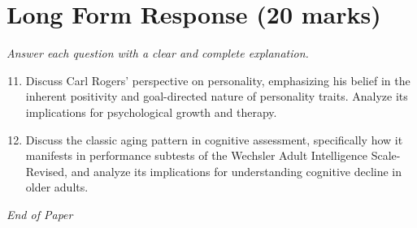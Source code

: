 \documentclass[12pt]{article}
\begin{document}
\section*{Long Form Response (20 marks)}
\textit{Answer each question with a clear and complete explanation.}
\begin{enumerate}[label=\arabic*.]
\setcounter{enumi}{10}
\item Discuss Carl Rogers' perspective on personality, emphasizing his belief in the inherent positivity and goal-directed nature of personality traits. Analyze its implications for psychological growth and therapy.
\item Discuss the classic aging pattern in cognitive assessment, specifically how it manifests in performance subtests of the Wechsler Adult Intelligence Scale-Revised, and analyze its implications for understanding cognitive decline in older adults.
\end{enumerate}

\vfill
\noindent\textit{End of Paper}
\end{document}
